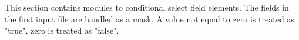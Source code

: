 This section contains modules to conditional select field elements.
The fields in the first input file are handled as a mask. 
A value not equal to zero is treated as "true", zero is treated as "false".
